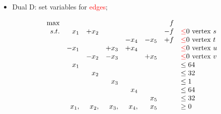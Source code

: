 \documentclass[mathserif]{beamer}
\begin{document}
{\begin{itemize}
\item 
{\sc Dual D}: set variables for \textcolor{red}{edges};
\begin{small}
\[
\begin{array}{rrrrrrrl}
 \max &         &            &          &            &           &    f   &\\
 s.t.     & x_1  & +x_2 &           &            &           &-f   & \textcolor{red}{\leq} 0  \text{ vertex } s\\
        &        &             &           &    -x_4 & -x_5 &+f & \textcolor{red}{\leq} 0  \text{ vertex } t\\
        & -x_1&            & +x_3 &+x_4   &         &      & \textcolor{red}{\leq}0  \text{ vertex } u\\
        &         &-x_2    & -x_3   &            &+x_5 &     & \textcolor{red}{\leq}0  \text{ vertex } v\\
        & x_1  &           &            &            &          &     & \leq 64 \\
        &   &   x_2        &            &            &          &     & \leq 32 \\
        &        &           &  x_{3}          &            &          &     & \leq 1 \\
        &        &           &            &      x_{4}      &          &     & \leq  64 \\
        &        &           &            &            &   x_{5}       &     & \leq 32 \\
        & x_1,  &  x_{2},         &   x_{3},         &    x_{4},        &  x_{5}        &     & \geq 0 \\
\end{array} \nonumber
\]
\end{small}


 \begin{figure}
\end{figure}
\end{itemize}}
\end{document}
